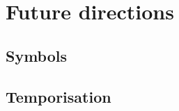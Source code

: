 
\section{Future directions}
\label{apdx-future}

\subsection{Symbols}

\subsection{Temporisation}

